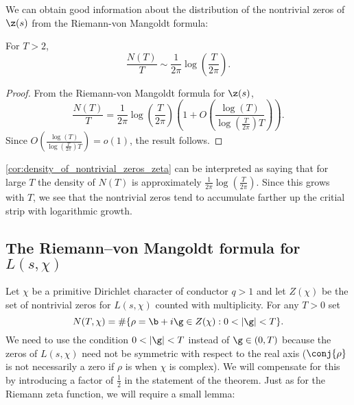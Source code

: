       We can obtain good information about the distribution of the nontrivial zeros of $\z(s)$ from the Riemann-von Mangoldt formula:

      \begin{corollary}\label{cor:density_of_nontrivial_zeros_zeta}
        For $T > 2$,
        \[
          \frac{N(T)}{T} \sim \frac{1}{2\pi}\log\left(\frac{T}{2\pi}\right).
        \]
      \end{corollary}
      \begin{proof}
        From the Riemann-von Mangoldt formula for $\z(s)$,
        \[
          \frac{N(T)}{T} = \frac{1}{2\pi}\log\left(\frac{T}{2\pi}\right)\left(1+O\left(\frac{\log(T)}{\log\left(\frac{T}{2\pi}\right)T}\right)\right).
        \]
        Since $O\left(\frac{\log(T)}{\log\left(\frac{T}{2\pi}\right)T}\right) = o(1)$, the result follows.
      \end{proof}

      \cref{cor:density_of_nontrivial_zeros_zeta} can be interpreted as saying that for large $T$ the density of $N(T)$ is approximately $\frac{1}{2\pi}\log\left(\frac{T}{2\pi}\right)$. Since this grows with $T$, we see that the nontrivial zeros tend to accumulate farther up the critial strip with logarithmic growth.
    \subsection*{The Riemann–von Mangoldt formula for $L(s,\chi)$}
      Let $\chi$ be a primitive Dirichlet character of conductor $q > 1$ and let $Z(\chi)$ be the set of nontrivial zeros for $L(s,\chi)$ counted with multiplicity. For any $T > 0$ set
      \[
        N(T,\chi) = \#\{\rho = \b+i\g \in Z(\chi):0 < |\g| < T\}.
      \]
      We need to use the condition $0 < |\g| < T$ instead of $\g \in (0,T)$ because the zeros of $L(s,\chi)$ need not be symmetric with respect to the real axis ($\conj{\rho}$ is not necessarily a zero if $\rho$ is when $\chi$ is complex). We will compensate for this by introducing a factor of $\frac{1}{2}$ in the statement of the theorem. Just as for the Riemann zeta function, we will require a small lemma:

